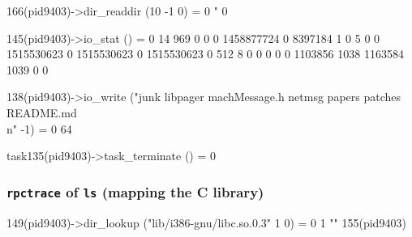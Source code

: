 \documentclass{beamer}
\begin{document}
\begin{frame}[fragile]
\begin{semiverbatim}
  166(pid9403)->dir_readdir (10 -1 0) = 0 " 0

  145(pid9403)->io_stat () = 0 {14 969 0 0 0 1458877724 0 8397184 1 0 5 0 0 1515530623 0 1515530623 0 1515530623 0 512 8 0 0 0 0 0 1103856 1038 1163584 1039 0 0}

  138(pid9403)->io_write ("junk  libpager machMessage.h  netmsg  papers  patches README.md\\n" -1) = 0 64

task135(pid9403)->task_terminate () = 0 
\end{semiverbatim}
\end{frame}


\begin{frame}[fragile]
\frametitle{{\tt rpctrace} of {\tt ls} (mapping the C library)}
\begin{semiverbatim}
\tiny
  149(pid9403)->dir_lookup ("lib/i386-gnu/libc.so.0.3" 1 0) = 0 1 ""    155(pid9403)


\end{semiverbatim}
\end{frame}
\end{document}
